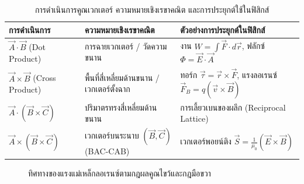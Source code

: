 \begin{table}[htbp]
    \centering
    \caption{การดำเนินการคูณเวกเตอร์ ความหมายเชิงเรขาคณิต และการประยุกต์ใช้ในฟิสิกส์}
    \label{tab:vector_products}
    \begin{tabularx}{\textwidth}{p{3.8cm}p{4.2cm}Y}
        \toprule
        \textbf{การดำเนินการ} & \textbf{ความหมายเชิงเรขาคณิต} & \textbf{ตัวอย่างการประยุกต์ในฟิสิกส์} \\
        \midrule
        $\vec{A} \cdot \vec{B}$ (Dot Product) & การฉายเวกเตอร์ / วัดความขนาน & งาน $W = \int \vec{F} \cdot d\vec{r}$, ฟลักซ์ $\Phi = \vec{E} \cdot \vec{A}$ \\
        $\vec{A} \times \vec{B}$ (Cross Product) & พื้นที่สี่เหลี่ยมด้านขนาน / เวกเตอร์ตั้งฉาก & ทอร์ก $\vec{\tau} = \vec{r} \times \vec{F}$, แรงลอเรนซ์ $\vec{F}_B = q(\vec{v} \times \vec{B})$ \\
        $\vec{A} \cdot (\vec{B} \times \vec{C})$ & ปริมาตรทรงสี่เหลี่ยมด้านขนาน & การเลี้ยวเบนของผลึก (Reciprocal Lattice) \\
        $\vec{A} \times (\vec{B} \times \vec{C})$ & เวกเตอร์บนระนาบ $(\vec{B}, \vec{C})$ (BAC-CAB) & เวกเตอร์พอยน์ติง $\vec{S} = \frac{1}{\mu_0}(\vec{E} \times \vec{B})$ \\
        \bottomrule
    \end{tabularx}
\end{table}

\begin{figure}[htbp]
    \centering
    \caption{ทิศทางของแรงแม่เหล็กลอเรนซ์ตามกฎผลคูณไขว้และกฎมือขวา}
    \label{fig:lorentz_force_diagram}
\end{figure}

